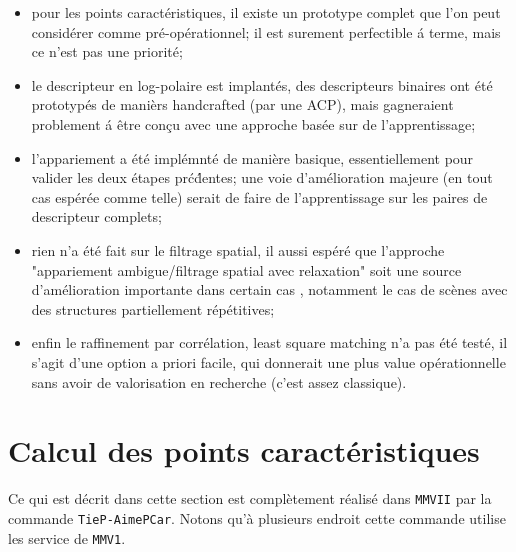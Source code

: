 \begin{itemize}
   \item pour les points caract\'eristiques, il existe un prototype complet que l'on peut consid\'erer comme 
         pr\'e-op\'erationnel; il est surement perfectible \'a terme, mais ce n'est pas une priorit\'e; 

   \item le descripteur en log-polaire est implant\'es, des descripteurs binaires ont \'et\'e prototyp\'es de
         mani\`ers handcrafted (par une ACP),  mais gagneraient problement \'a \^etre con\c{c}u avec une 
         approche bas\'ee sur de l'apprentissage;

   \item l'appariement a \'et\'e impl\'emnt\'e de mani\`ere basique, essentiellement pour valider les deux
         \'etapes pr\'c\'dentes;  une voie d'am\'elioration majeure (en tout cas esp\'er\'ee comme telle)
         serait de faire de l'apprentissage sur les paires de descripteur complets;

   \item rien n'a \'et\'e fait sur le filtrage spatial, il aussi esp\'er\'e  que l'approche 
         "appariement ambigue/filtrage spatial avec relaxation" soit une source d'am\'elioration importante
         dans certain cas , notamment le cas de sc\`enes avec des structures partiellement r\'ep\'etitives;

   \item enfin le raffinement par corr\'elation, least square matching n'a pas \'et\'e test\'e, il s'agit
         d'une option a priori facile, qui donnerait une plus value op\'erationnelle sans avoir de valorisation
         en recherche (c'est assez classique).

\end{itemize}



\section{Calcul des points caract\'eristiques}


Ce qui est  d\'ecrit dans cette section est compl\`etement r\'ealis\'e dans  {\tt MMVII}
par la commande {\tt TieP-AimePCar}. Notons qu'\`a plusieurs endroit cette commande
utilise les service de {\tt MMV1}.

